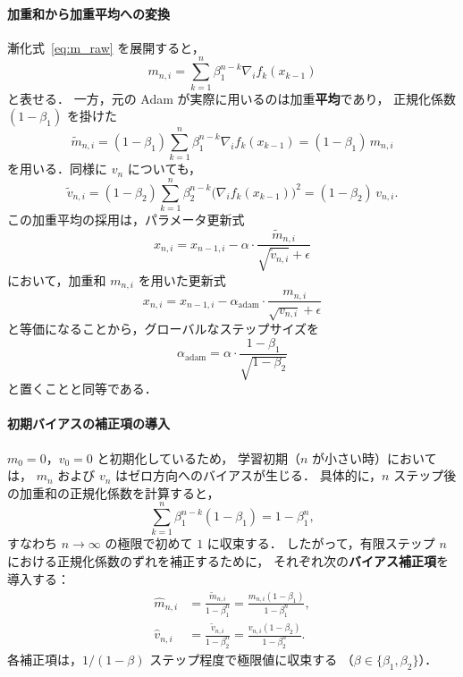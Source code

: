 \documentclass[dvipdfmx,a4paper,11pt]{jsarticle}
\begin{document}
\paragraph{加重和から加重平均への変換}

漸化式~\eqref{eq:m_raw} を展開すると，
\begin{equation}
    m_{n,i}
    = \sum_{k=1}^{n} \beta_1^{n-k} \nabla_i f_k(x_{k-1})
\end{equation}
と表せる．
一方，元の Adam が実際に用いるのは加重\textbf{平均}であり，
正規化係数 $(1-\beta_1)$ を掛けた
\begin{equation}
    \tilde{m}_{n,i}
    = (1-\beta_1)\sum_{k=1}^{n} \beta_1^{n-k} \nabla_i f_k(x_{k-1})
    = (1-\beta_1)\,m_{n,i}
    \label{eq:m_tilde}
\end{equation}
を用いる．同様に $v_n$ についても，
\begin{equation}
    \tilde{v}_{n,i}
    = (1-\beta_2)\sum_{k=1}^{n} \beta_2^{n-k} \bigl(\nabla_i f_k(x_{k-1})\bigr)^2
    = (1-\beta_2)\,v_{n,i}.
    \label{eq:v_tilde}
\end{equation}
この加重平均の採用は，パラメータ更新式
\begin{equation}
    x_{n,i} = x_{n-1,i} - \alpha \cdot \frac{\tilde{m}_{n,i}}{\sqrt{\tilde{v}_{n,i}} + \epsilon}
\end{equation}
において，加重和 $m_{n,i}$ を用いた更新式
\begin{equation}
    x_{n,i} = x_{n-1,i} - \alpha_{\mathrm{adam}} \cdot \frac{m_{n,i}}{\sqrt{v_{n,i}} + \epsilon}
\end{equation}
と等価になることから，グローバルなステップサイズを
\begin{equation}
    \alpha_{\mathrm{adam}}
    = \alpha \cdot \frac{1-\beta_1}{\sqrt{1-\beta_2}}
    \label{eq:alpha_adam_base}
\end{equation}
と置くことと同等である．

\paragraph{初期バイアスの補正項の導入}

$m_0 = 0$，$v_0 = 0$ と初期化しているため，
学習初期（$n$ が小さい時）においては，
$m_n$ および $v_n$ はゼロ方向へのバイアスが生じる．
具体的に，$n$ ステップ後の加重和の正規化係数を計算すると，
\begin{equation}
    \sum_{k=1}^{n} \beta_1^{n-k}(1-\beta_1)
    = 1 - \beta_1^n,
\end{equation}
すなわち $n \to \infty$ の極限で初めて $1$ に収束する．
したがって，有限ステップ $n$ における正規化係数のずれを補正するために，
それぞれ次の\textbf{バイアス補正項}を導入する：
\begin{align}
    \hat{m}_{n,i} &= \frac{\tilde{m}_{n,i}}{1-\beta_1^n}
    = \frac{m_{n,i} (1-\beta_1)}{1-\beta_1^n}, \\
    \hat{v}_{n,i} &= \frac{\tilde{v}_{n,i}}{1-\beta_2^n}
    = \frac{v_{n,i}(1-\beta_2)}{1-\beta_2^n}.
\end{align}
各補正項は，$1/(1-\beta)$ ステップ程度で極限値に収束する
（$\beta \in \{\beta_1, \beta_2\}$）．
\end{document}
